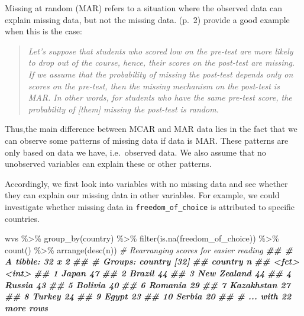 \documentclass[
]{book}
\newenvironment{Shaded}{\begin{snugshade}}{\end{snugshade}}
\newcommand{\CommentTok}[1]{\textcolor[rgb]{0.56,0.35,0.01}{\textit{#1}}}
\newcommand{\DocumentationTok}[1]{\textcolor[rgb]{0.56,0.35,0.01}{\textbf{\textit{#1}}}}
\newcommand{\FunctionTok}[1]{\textcolor[rgb]{0.00,0.00,0.00}{#1}}
\newcommand{\NormalTok}[1]{#1}
\newcommand{\SpecialCharTok}[1]{\textcolor[rgb]{0.00,0.00,0.00}{#1}}
\begin{document}
Missing at random (MAR) refers to a situation where the observed data can explain missing data, but not the missing data. \citet{dong-et-al-2013} (p.~2) provide a good example when this is the case:

\begin{quote}
\emph{Let's suppose that students who scored low on the pre-test are more likely to drop out of the course, hence, their scores on the post-test are missing. If we assume that the probability of missing the post-test depends only on scores on the pre-test, then the missing mechanism on the post-test is MAR. In other words, for students who have the same pre-test score, the probability of {[}them{]} missing the post-test is random.}
\end{quote}

Thus,the main difference between MCAR and MAR data lies in the fact that we can observe some patterns of missing data if data is MAR. These patterns are only based on data we have, i.e.~observed data. We also assume that no unobserved variables can explain these or other patterns.

Accordingly, we first look into variables with no missing data and see whether they can explain our missing data in other variables. For example, we could investigate whether missing data in \texttt{freedom\_of\_choice} is attributed to specific countries.

\begin{Shaded}
\begin{Highlighting}[]
\NormalTok{wvs }\SpecialCharTok{\%\textgreater{}\%} 
  \FunctionTok{group\_by}\NormalTok{(country) }\SpecialCharTok{\%\textgreater{}\%} 
  \FunctionTok{filter}\NormalTok{(}\FunctionTok{is.na}\NormalTok{(freedom\_of\_choice)) }\SpecialCharTok{\%\textgreater{}\%} 
  \FunctionTok{count}\NormalTok{() }\SpecialCharTok{\%\textgreater{}\%} 
  \FunctionTok{arrange}\NormalTok{(}\FunctionTok{desc}\NormalTok{(n))                      }\CommentTok{\# Rearranging scores for easier reading}
\DocumentationTok{\#\# \# A tibble: 32 x 2}
\DocumentationTok{\#\# \# Groups:   country [32]}
\DocumentationTok{\#\#    country         n}
\DocumentationTok{\#\#    \textless{}fct\textgreater{}       \textless{}int\textgreater{}}
\DocumentationTok{\#\#  1 Japan          47}
\DocumentationTok{\#\#  2 Brazil         44}
\DocumentationTok{\#\#  3 New Zealand    44}
\DocumentationTok{\#\#  4 Russia         43}
\DocumentationTok{\#\#  5 Bolivia        40}
\DocumentationTok{\#\#  6 Romania        29}
\DocumentationTok{\#\#  7 Kazakhstan     27}
\DocumentationTok{\#\#  8 Turkey         24}
\DocumentationTok{\#\#  9 Egypt          23}
\DocumentationTok{\#\# 10 Serbia         20}
\DocumentationTok{\#\# \# ... with 22 more rows}
\end{Highlighting}
\end{Shaded}
\end{document}
